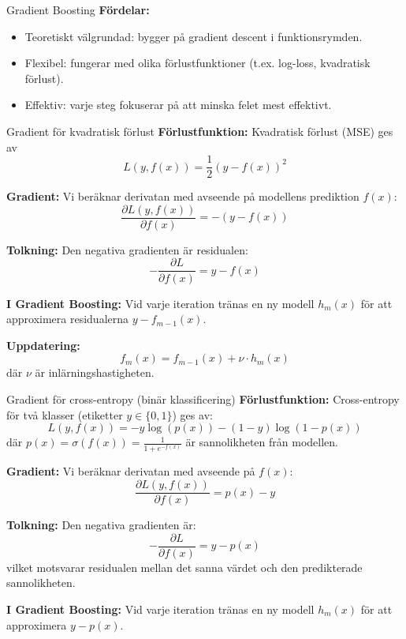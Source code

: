 \documentclass[10pt,english]{beamer}
\begin{document}
\begin{frame}{Gradient Boosting}
  \textbf{Fördelar:}
  \begin{itemize}
    \item Teoretiskt välgrundad: bygger på gradient descent i funktionsrymden.
    \item Flexibel: fungerar med olika förlustfunktioner (t.ex. log-loss, kvadratisk förlust).
    \item Effektiv: varje steg fokuserar på att minska felet mest effektivt.
  \end{itemize}
\end{frame}



\begin{frame}{Gradient för kvadratisk förlust}
  \textbf{Förlustfunktion:} Kvadratisk förlust (MSE) ges av
  \[
    L(y, f(x)) = \frac{1}{2}(y - f(x))^2
  \]

  
  \textbf{Gradient:} Vi beräknar derivatan med avseende på modellens prediktion $f(x)$:
  \[
    \frac{\partial L(y, f(x))}{\partial f(x)} = - (y - f(x))
  \]

  
  \textbf{Tolkning:} Den negativa gradienten är residualen:
  \[
    -\frac{\partial L}{\partial f(x)} = y - f(x)
  \]

  
  \textbf{I Gradient Boosting:} Vid varje iteration tränas en ny modell $h_m(x)$ för att approximera residualerna $y - f_{m-1}(x)$.

  
  \textbf{Uppdatering:}
  \[
    f_m(x) = f_{m-1}(x) + \nu \cdot h_m(x)
  \]
  där $\nu$ är inlärningshastigheten.
\end{frame}



\begin{frame}{Gradient för cross-entropy (binär klassificering)}
  \textbf{Förlustfunktion:} Cross-entropy för två klasser (etiketter $y \in \{0, 1\}$) ges av:
  \[
    L(y, f(x)) = -y \log(p(x)) - (1 - y) \log(1 - p(x))
  \]
  \vspace{0.4cm}
  där $p(x) = \sigma(f(x)) = \frac{1}{1 + e^{-f(x)}}$ är sannolikheten från modellen.

  
  \textbf{Gradient:} Vi beräknar derivatan med avseende på $f(x)$:
  \[
    \frac{\partial L(y, f(x))}{\partial f(x)} = p(x) - y
  \]

  
  \textbf{Tolkning:} Den negativa gradienten är:
  \[
    -\frac{\partial L}{\partial f(x)} = y - p(x)
  \]
  vilket motsvarar residualen mellan det sanna värdet och den predikterade sannolikheten.

  \textbf{I Gradient Boosting:} Vid varje iteration tränas en ny modell $h_m(x)$ för att approximera $y - p(x)$.
\end{frame}
\end{document}
